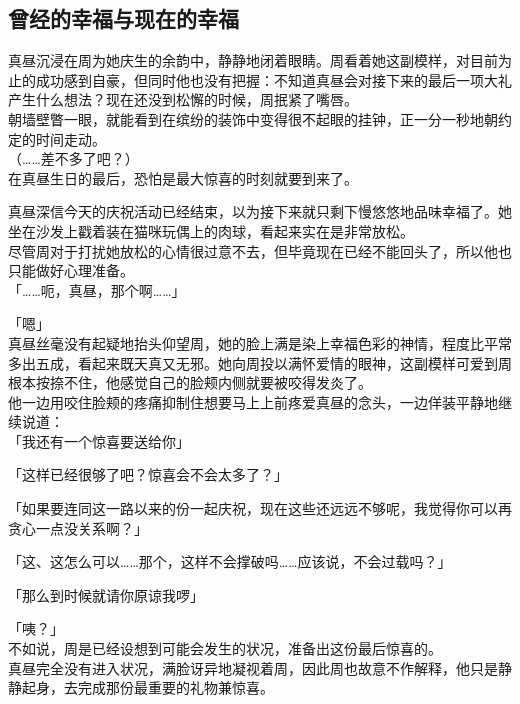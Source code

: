 \subsection{曾经的幸福与现在的幸福}

真昼沉浸在周为她庆生的余韵中，静静地闭着眼睛。周看着她这副模样，对目前为止的成功感到自豪，但同时他也没有把握：不知道真昼会对接下来的最后一项大礼产生什么想法？现在还没到松懈的时候，周抿紧了嘴唇。\\

朝墙壁瞥一眼，就能看到在缤纷的装饰中变得很不起眼的挂钟，正一分一秒地朝约定的时间走动。\\

（……差不多了吧？）\\

在真昼生日的最后，恐怕是最大惊喜的时刻就要到来了。

真昼深信今天的庆祝活动已经结束，以为接下来就只剩下慢悠悠地品味幸福了。她坐在沙发上戳着装在猫咪玩偶上的肉球，看起来实在是非常放松。\\

尽管周对于打扰她放松的心情很过意不去，但毕竟现在已经不能回头了，所以他也只能做好心理准备。\\

「……呃，真昼，那个啊……」

「嗯」\\

真昼丝毫没有起疑地抬头仰望周，她的脸上满是染上幸福色彩的神情，程度比平常多出五成，看起来既天真又无邪。她向周投以满怀爱情的眼神，这副模样可爱到周根本按捺不住，他感觉自己的脸颊内侧就要被咬得发炎了。\\

他一边用咬住脸颊的疼痛抑制住想要马上上前疼爱真昼的念头，一边佯装平静地继续说道：\\

「我还有一个惊喜要送给你」

「这样已经很够了吧？惊喜会不会太多了？」

「如果要连同这一路以来的份一起庆祝，现在这些还远远不够呢，我觉得你可以再贪心一点没关系啊？」

「这、这怎么可以……那个，这样不会撑破吗……应该说，不会过载吗？」

「那么到时候就请你原谅我啰」

「咦？」\\

不如说，周是已经设想到可能会发生的状况，准备出这份最后惊喜的。\\

真昼完全没有进入状况，满脸讶异地凝视着周，因此周也故意不作解释，他只是静静起身，去完成那份最重要的礼物兼惊喜。\\

